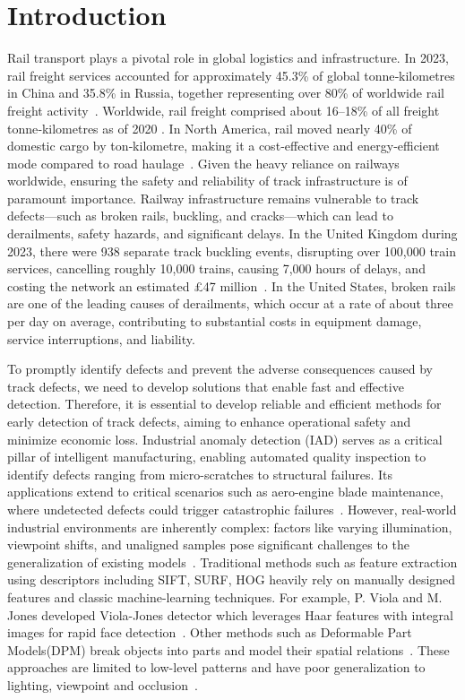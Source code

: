 \section{Introduction}

Rail transport plays a pivotal role in global logistics and infrastructure. 
In 2023, rail freight services accounted for approximately 45.3\% of global tonne‑kilometres in China and 35.8\% in Russia, together representing over 80\% of worldwide rail freight activity~\cite{reportlinker_global_freight_2023}. 
Worldwide, rail freight comprised about 16–18\% of all freight tonne‑kilometres as of 2020 . 
In North America, rail moved nearly 40\% of domestic cargo by ton‑kilometre, making it a cost‑effective and energy‑efficient mode compared to road haulage~\cite{wiki_rail_freight_transport}.
Given the heavy reliance on railways worldwide, ensuring the safety and reliability of track infrastructure is of paramount importance.
Railway infrastructure remains vulnerable to track defects—such as broken rails, buckling, and cracks—which can lead to derailments, safety hazards, and significant delays. 
In the United Kingdom during 2023, there were 938 separate track buckling events, disrupting over 100,000 train services, cancelling roughly 10,000 trains, causing 7,000 hours of delays, and costing the network an estimated £47 million~\cite{uk_track_buckling_2024}.
In the United States, broken rails are one of the leading causes of derailments, which occur at a rate of about three per day on average, contributing to substantial costs in equipment damage, service interruptions, and liability.

To promptly identify defects and prevent the adverse consequences caused by track defects, we need to develop solutions that enable fast and effective detection.
Therefore, it is essential to develop reliable and efficient methods for early detection of track defects, aiming to enhance operational safety and minimize economic loss.
Industrial anomaly detection (IAD) serves as a critical pillar of intelligent manufacturing, enabling automated quality inspection to identify defects ranging from micro-scratches to structural failures. 
Its applications extend to critical scenarios such as aero-engine blade maintenance, where undetected defects could trigger catastrophic failures~\cite{intro1}. 
However, real-world industrial environments are inherently complex: factors like varying illumination, viewpoint shifts, and unaligned samples pose significant challenges to the generalization of existing models~\cite{intro2}. 
Traditional methods such as feature extraction using descriptors including SIFT, SURF, HOG heavily rely on manually designed features 
and classic machine-learning techniques. For example, P. Viola and M. Jones developed Viola-Jones detector which leverages Haar features with integral images for rapid face detection~\cite{Viola-Jones}.
Other methods such as Deformable Part Models(DPM) break objects into parts and model their spatial relations~\cite{DFM}.
These approaches are limited to low-level patterns and have poor generalization to lighting, viewpoint and occlusion~\cite{why-traditional-bad}.

